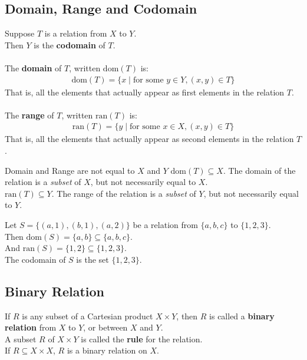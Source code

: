 \documentclass[../notes.tex]{subfiles}
\begin{document}
			\subsection{Domain, Range and Codomain}
				Suppose $T$ is a relation from $X$ to $Y$.\\
				Then $Y$ is the \textbf{codomain} of $T$.\\
				\vspace{2mm}\\
				The \textbf{domain} of $T$, written $\mathrm{dom}(T)$ is:
					\begin{align*}
						\mathrm{dom}(T) = \{x \mid \text{for some } y \in Y, (x, y) \in T\}
					\end{align*}
				That is, all the elements that actually appear as first elements in the relation $T$.\\
				\vspace{2mm}\\
				The \textbf{range} of $T$, written $\mathrm{ran}(T)$ is:
				\begin{align*}
					\mathrm{ran}(T) = \{y \mid \text{for some } x \in X, (x, y) \in T\}
				\end{align*}
			That is, all the elements that actually appear as second elements in the relation $T$.
			\begin{notebox}{Domain and Range are not equal to $X$ and $Y$}
				$\mathrm{dom}(T) \subseteq X$. The domain of the relation is a \textit{subset} of $X$, but not necessarily equal to $X$.\\
				$\mathrm{ran}(T) \subseteq Y$. The range of the relation is a \textit{subset} of $Y$, but not necessarily equal to $Y$.
			\end{notebox}
			\begin{examplebox}
				Let $S = \bigl\{(a, 1), (b, 1), (a, 2)\bigr\}$ be a relation from $\{a, b, c\}$ to $\{1, 2, 3\}$.\\
				Then $\mathrm{dom}(S) = \{a, b\} \subseteq \{a, b, c\}$.\\
				And $\mathrm{ran}(S) = \{1, 2\} \subseteq \{1, 2, 3\}$.\\
				The codomain of $S$ is the set $\{1, 2, 3\}$. 
			\end{examplebox}
			\subsection{Binary Relation}
				If $R$ is any subset of a Cartesian product $X \times Y$, then $R$ is called a \textbf{binary relation} from $X$ to $Y$, or between $X$ and $Y$.\\
				A subset $R$ of $X \times Y$ is called the \textbf{rule} for the relation.\\
				If $R \subseteq X \times X$, $R$ is a binary relation on $X$.
			\pagebreak
\end{document}
